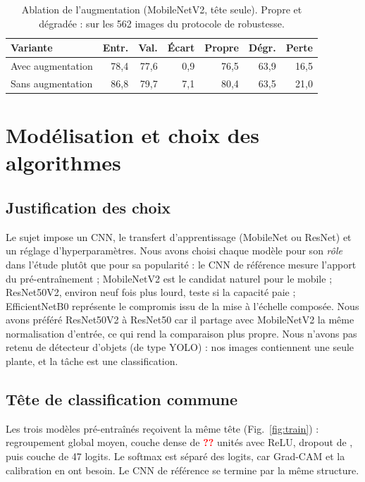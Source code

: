 \documentclass[conference]{IEEEtran}
\newcommand{\todo}{\textcolor{red}{\textbf{??}}}
\newcommand{\nClasses}{47}\newcommand{\imbalance}{\todo}\newcommand{\nDup}{\todo}
\newcommand{\hpDense}{\todo}\newcommand{\hpSmooth}{\todo}\newcommand{\resultsRows}{}
\begin{document}
\begin{table}[!htb]
\caption{Ablation de l'augmentation (MobileNetV2, tête seule). Propre et dégradée : sur les 562 images du protocole de robustesse.}
\label{tab:abl}
\centering\scriptsize\setlength{\tabcolsep}{2.5pt}
\begin{tabular}{@{}lrrrrrr@{}}
\toprule
Variante & Entr. & Val. & Écart & Propre & Dégr. & Perte\\
\midrule
Avec augmentation & 78{,}4 & 77{,}6 & 0{,}9 & 76{,}5 & 63{,}9 & 16{,}5 \\
Sans augmentation & 86{,}8 & 79{,}7 & 7{,}1 & 80{,}4 & 63{,}5 & 21{,}0 \\
\bottomrule
\end{tabular}
\end{table}

\section{Modélisation et choix des algorithmes}\label{sec:model}
\subsection{Justification des choix}
Le sujet impose un CNN, le transfert d'apprentissage (MobileNet ou ResNet) et un réglage d'hyperparamètres. Nous avons choisi chaque modèle pour son \emph{rôle} dans l'étude plutôt que pour sa popularité : le CNN de référence mesure l'apport du pré-entraînement ; MobileNetV2 est le candidat naturel pour le mobile ; ResNet50V2, environ neuf fois plus lourd, teste si la capacité paie ; EfficientNetB0 représente le compromis issu de la mise à l'échelle composée. Nous avons préféré ResNet50V2 à ResNet50 car il partage avec MobileNetV2 la même normalisation d'entrée, ce qui rend la comparaison plus propre. Nous n'avons pas retenu de détecteur d'objets (de type YOLO) : nos images contiennent une seule plante, et la tâche est une classification.

\subsection{Tête de classification commune}
Les trois modèles pré-entraînés reçoivent la même tête (Fig.~\ref{fig:train}) : regroupement global moyen, couche dense de \hpDense{} unités avec ReLU, dropout de \hpDropout{}, puis couche de \nClasses{} logits. Le softmax est séparé des logits, car Grad-CAM et la calibration en ont besoin. Le CNN de référence se termine par la même structure.
\end{document}
